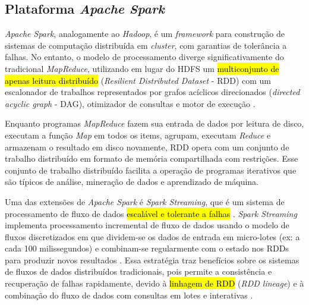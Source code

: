 
\subsection{Plataforma \emph{Apache Spark}}

\emph{Apache Spark}, analogamente ao \emph{Hadoop}, é um \emph{framework} para
construção de sistemas de computação distribuída em \emph{cluster}, com garantias
de tolerância a falhas.
No entanto, o modelo de processamento diverge
significativamente do tradicional \emph{MapReduce}, utilizando em lugar do HDFS
um \hl{multiconjunto de apenas leitura distribuído} (\emph{Resilient Distributed Dataset}
- RDD) com um escalonador de trabalhos representados por grafos acíclicos
direcionados (\emph{directed acyclic graph} - DAG), otimizador de consultas e
motor de execução \cite{ApacheSpark2020}.


Enquanto programas \emph{MapReduce} fazem sua entrada de dados por leitura de
disco, executam a função \emph{Map} em todos os items, agrupam, executam
\emph{Reduce} e armazenam o resultado em disco novamente, RDD opera com um
conjunto de trabalho distribuído em formato de memória compartilhada com
restrições. Esse conjunto de trabalho distribuído facilita a operação de programas iterativos
que são típicos de análise, mineração de dados e aprendizado de máquina.

Uma das extensões de \emph{Apache Spark} é \emph{Spark Streaming}, que é um
sistema de processamento de fluxo de dados 
\hl{escalável e tolerante a falhas}
\cite{zaharia2016,sparkStreaming2016}.
\emph{Spark Streaming} implementa processamento incremental de fluxo de
dados usando o modelo de fluxos discretizados em que dividem-se os dados de entrada
em micro-lotes (ex: a cada 100 milissegundos) e combinam-se regularmente com o
estado nos RDDs para produzir novos resultados \cite{zaharia2016}.
Essa estratégia traz benefícios sobre os sistemas de fluxos de dados distribuídos
tradicionais, pois permite a consistência e recuperação de falhas rapidamente,
devido à \hl{linhagem de RDD} (\emph{RDD lineage})
e à combinação do fluxo de dados com
consultas em lotes e interativas \cite{sparkStreaming2016,Lopez2018}.

